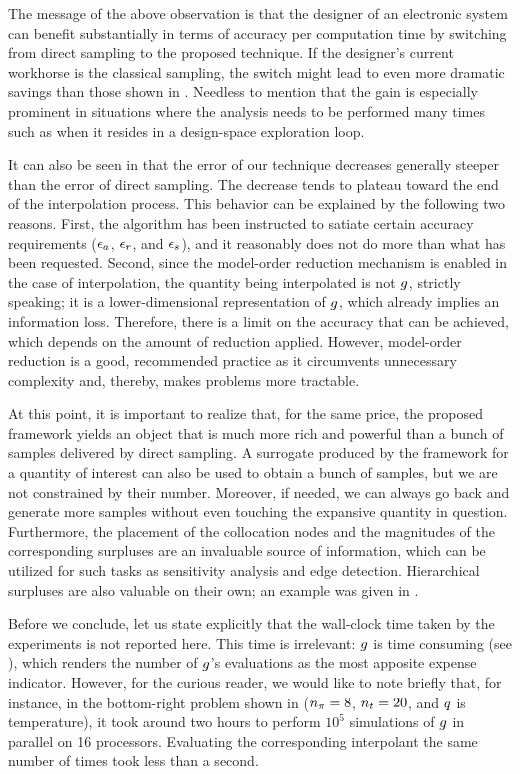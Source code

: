 The message of the above observation is that the designer of an electronic
system can benefit substantially in terms of accuracy per computation time by
switching from direct sampling to the proposed technique. If the designer's
current workhorse is the classical  sampling, the switch might lead to
even more dramatic savings than those shown in . Needless to
mention that the gain is especially prominent in situations where the analysis
needs to be performed many times such as when it resides in a design-space
exploration loop.

It can also be seen in  that the error of our technique decreases
generally steeper than the error of direct sampling. The decrease tends to
plateau toward the end of the interpolation process. This behavior can be
explained by the following two reasons. First, the algorithm has been instructed
to satiate certain accuracy requirements ($\epsilon_a$, $\epsilon_r$, and $\epsilon_s$),
and it reasonably does not do more than what has been requested. Second, since
the model-order reduction mechanism is enabled in the case of interpolation, the
quantity being interpolated is not $g$, strictly speaking; it is a
lower-dimensional representation of $g$, which already implies an information
loss. Therefore, there is a limit on the accuracy that can be achieved, which
depends on the amount of reduction applied. However, model-order reduction is a
good, recommended practice as it circumvents unnecessary complexity and,
thereby, makes problems more tractable.

At this point, it is important to realize that, for the same price, the proposed
framework yields an object that is much more rich and powerful than a bunch of
samples delivered by direct sampling. A surrogate produced by the framework for
a quantity of interest can also be used to obtain a bunch of samples, but we are
not constrained by their number. Moreover, if needed, we can always go back and
generate more samples without even touching the expansive quantity in question.
Furthermore, the placement of the collocation nodes and the magnitudes of the
corresponding surpluses are an invaluable source of information, which can be
utilized for such tasks as sensitivity analysis and edge detection. Hierarchical
surpluses are also valuable on their own; an example was given in
.

Before we conclude, let us state explicitly that the wall-clock time taken by
the experiments is not reported here. This time is irrelevant: $g$ is time
consuming (see ), which renders the number of $g$'s evaluations
as the most apposite expense indicator. However, for the curious reader, we
would like to note briefly that, for instance, in the bottom-right problem shown
in  (${n_\pi} = 8$, ${n_t} = 20$, and $q$ is temperature), it took
around two hours to perform $10^5$ simulations of $g$ in parallel on 16
processors. Evaluating the corresponding interpolant the same number of times
took less than a second.
